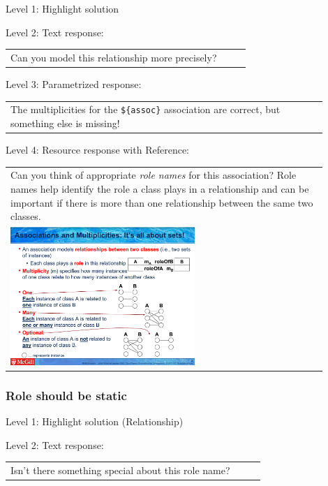 \noindent Level 1: Highlight solution  \medskip

\noindent Level 2: Text response: \medskip

\begin{tabular}{|p{0.9\linewidth}}
Can you model this relationship more precisely?
\end{tabular} \medskip

\noindent Level 3: Parametrized response: \medskip

\begin{tabular}{|p{0.9\linewidth}}
The multiplicities for the \verb|${assoc}| association are correct, but something else is missing!
\end{tabular} \medskip

\noindent Level 4: Resource response with Reference: \medskip

\begin{tabular}{|p{0.9\linewidth}}
Can you think of appropriate \textit{role names}
for this association? Role names help identify the role a class plays in a
relationship and can be important if there is more than one relationship
between the same two classes.

\\
\includegraphics[width=0.6\textwidth]{images/role_name.png}

\end{tabular} \medskip


\subsubsection{Role should be static}

\noindent Level 1: Highlight solution (Relationship) \medskip

\noindent Level 2: Text response: \medskip

\begin{tabular}{|p{0.9\linewidth}}
Isn't there something special about this role name?
\end{tabular} \medskip

